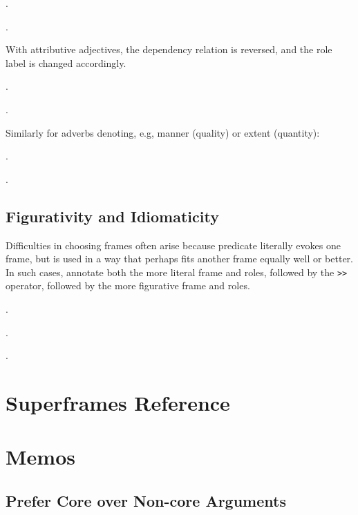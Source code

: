 \documentclass[a4paper]{article}
\newcommand{\rl}[1]{\textsf{#1}}
\begin{document}
\ex.

\ex.

With attributive adjectives, the dependency relation is reversed, and the role label is changed accordingly.

\ex.

\ex.

Similarly for adverbs denoting, e.g, manner (\rl{quality}) or extent (\rl{quantity}):

\ex.

\ex.

\subsection{Figurativity and Idiomaticity}

Difficulties in choosing frames often arise because predicate literally evokes
one frame, but is used in a way that perhaps fits another frame equally well or
better. In such cases, annotate both the more literal frame and roles, followed
by the \texttt{>}\texttt{>} operator, followed by the more figurative frame and roles.

\ex.

\ex.

\ex.

\section{Superframes Reference}

\section{Memos}

\subsection{Prefer Core over Non-core Arguments}



\end{document}
